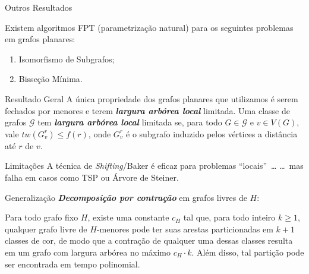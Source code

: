 \begin{frame}{Outros Resultados}
    \begin{thm}
        Existem algoritmos FPT (parametrização natural) para os seguintes problemas em grafos planares:

        \begin{enumerate}[]
            \item Isomorfismo de Subgrafos;
            \item Bisseção Mínima.
        \end{enumerate}
    \end{thm}
\end{frame}

\begin{frame}{Resultado Geral}
    A única propriedade dos grafos planares que utilizamos é serem fechados por menores e terem \textbf{\emph{largura arbórea local}} limitada.
    \pause \bigbreak
    Uma classe de grafos $\mathcal{G}$ tem \textbf{\emph{largura arbórea local}} limitada se, para todo $G \in \mathcal{G}$ e $v \in V(G)$, vale $tw(G_v^r) \le f(r)$, onde $G_v^r$ é o subgrafo induzido pelos vértices a distância até $r$ de $v$.
\end{frame}

\begin{frame}{Limitações}
    \centering
    A técnica de \emph{Shifting}/Baker é eficaz para problemas ``locais''~\dots
    \bigbreak\pause
    \dots~mas falha em casos como TSP ou Árvore de Steiner.
\end{frame}

\begin{frame}{Generalização}
    \centering\large
    \textbf{\emph{Decomposição por contração}} em grafos livres de $H$:
    \pause
    \bigbreak
    \begin{thm}
        Para todo grafo fixo $H$, existe uma constante $c_H$ tal que, \pause
        para todo inteiro $k \geq 1$, qualquer grafo livre de $H$-menores pode ter suas arestas particionadas em $k + 1$ classes de cor, \pause
        de modo que a contração de qualquer uma dessas classes resulta em um grafo com largura arbórea no máximo $c_H \cdot k$.
        \pause
        \bigbreak
        Além disso, tal partição pode ser encontrada em tempo polinomial.
    \end{thm}
\end{frame}